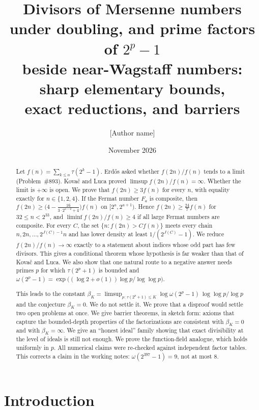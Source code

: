 \documentclass[11pt]{amsart}
\title{Divisors of Mersenne numbers under doubling, and prime factors of $2^p-1$\\
beside near-Wagstaff numbers: sharp elementary bounds,\\ exact reductions, and barriers}
\author{[Author name]}
\date{November 2026}
\theoremstyle{definition}
\theoremstyle{remark}
\begin{document}
\begin{abstract}
Let $f(n)=\sum_{k\le n}\tau(2^k-1)$. Erd\H{o}s asked whether $f(2n)/f(n)$ tends to a limit
(Problem~\#893). Kova\v{c} and Luca proved $\limsup f(2n)/f(n)=\infty$. Whether the limit is $+\infty$ is open.
We prove that $f(2n)\ge 3f(n)$ for every $n$, with equality exactly for $n\in\{1,2,4\}$. If the Fermat number $F_a$ is
composite, then $f(2n)\ge\bigl(4-\tfrac{16}{3\cdot2^{a-2}+4}\bigr)f(n)$ on $[2^a,2^{a+1})$. Hence
$f(2n)\ge\tfrac{24}{7}f(n)$ for $32\le n<2^{33}$, and $\liminf f(2n)/f(n)\ge4$ if all large Fermat numbers are composite.
For every $C$, the set $\{n:f(2n)>Cf(n)\}$ meets every chain $n,2n,\dots,2^{J(C)-1}n$ and has lower density at least
$1/(2^{J(C)}-1)$. We reduce $f(2n)/f(n)\to\infty$ exactly to a statement about indices whose odd part has few
divisors. This gives a conditional theorem whose hypothesis is far weaker than that of Kova\v{c} and Luca.
We also show that one natural route to a negative answer needs primes $p$ for which
$\tau(2^p+1)$ is bounded and $\omega(2^p-1)=\exp\bigl((\log2+o(1))\log p/\log\log p\bigr)$.

This leads to the constant
$\beta_K=\limsup_{p:\,\tau(2^p+1)\le K}\log\omega(2^p-1)\,\log\log p/\log p$ and the conjecture $\beta_K=0$.
We do not settle it. We prove that a disproof would settle two open problems at once. We give barrier theorems, in
sketch form: axioms that capture the bounded-depth properties of the factorizations are consistent with $\beta_K=0$
and with $\beta_K=\infty$.
We give an ``honest ideal'' family showing that exact divisibility at the level of ideals is still not enough.
We prove the function-field analogue, which holds uniformly in $p$. All numerical claims were re-checked against independent
factor tables. This corrects a claim in the working notes: $\omega(2^{397}-1)=9$, not at most $8$.
\end{abstract}

\maketitle
\tableofcontents

\section{Introduction}
\end{document}
